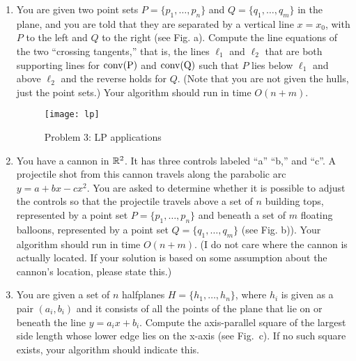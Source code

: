 \documentclass[11pt]{article}
\begin{document}
\begin{enumerate}

    \item You are given two point sets $P = \{p_1,\ldots,p_n\}$ and $Q =
        \{q_1,\ldots,q_m\}$ in the plane, and you are told that they are
        separated by a vertical line $x = x_0$, with $P$ to the left and $Q$ to
        the right (see Fig. a). Compute the line equations of the two
        ``crossing tangents,'' that is, the lines $\ell_1$ and $\ell_2$ that are
        both supporting lines for $\rm{conv}(P)$ and $\rm{conv}(Q)$ such that
        $P$ lies below $\ell_1$ and above $\ell_2$ and the reverse holds for
        $Q$. (Note that you are not given the hulls, just the point sets.) Your
        algorithm should run in time $O(n + m)$.

    \begin{figure}[h]
        \centering
        \texttt{[image: lp]}
        \label{fig:lp}
        \caption{Problem 3: LP applications}
    \end{figure}


    \item You have a cannon in $\mathbb{R}^2$. It has three controls labeled ``a'' ``b,''
        and ``c''. A projectile shot from this cannon travels along the
        parabolic arc $y = a + bx - cx^2$. You are asked to determine whether it
        is possible to adjust the controls so that the projectile travels above
        a set of $n$ building tops, represented by a point set $P = \{p_1,
        \ldots , p_n\}$ and beneath a set of $m$ floating balloons, represented
        by a point set $Q = \{q_1, \ldots , q_m\}$ (see Fig. b)). Your algorithm
        should run in time $O(n + m)$. (I do not care where the cannon is
        actually located. If your solution is based on some assumption about the
        cannon's location, please state this.)

    \item You are given a set of $n$ halfplanes $H = \{h_1,\ldots,h_n\}$, where
        $h_i$ is given as a pair $(a_i,b_i)$ and it consists of all the points
        of the plane that lie on or beneath the line $y = a_ix + b_i$. Compute
        the axis-parallel square of the largest side length whose lower edge
        lies on the x-axis (see Fig.~c). If no such square exists, your
        algorithm should indicate this.

\end{enumerate}
\end{document}
